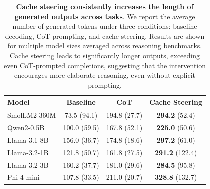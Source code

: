 \begin{table}[t!]
\caption{\textbf{Cache steering consistently increases the length of generated outputs across tasks}. We report the average number of generated tokens under three conditions: baseline decoding, CoT prompting, and cache steering. Results are shown for multiple model sizes averaged across reasoning
benchmarks. Cache steering leads to significantly longer outputs, exceeding even CoT-prompted completions, suggesting that the intervention encourages more elaborate reasoning, even without explicit prompting.}
\centering
\begin{tabular}{lccc}
\toprule
\textbf{Model} & \textbf{Baseline} & \textbf{CoT} & \textbf{Cache Steering} \\
\midrule
SmolLM2-360M & 73.5 \tiny{(94.1)} & 194.8 \tiny{(27.7)} & \textbf{294.2} \tiny{(52.4)} \\
Qwen2-0.5B & 100.0 \tiny{(59.5)} & 167.8 \tiny{(52.1)} & \textbf{225.0} \tiny{(50.6)} \\
Llama-3.1-8B & 156.0 \tiny{(36.7)} & 174.8 \tiny{(18.6)} & \textbf{297.2} \tiny{(61.0)} \\
Llama-3.2-1B & 121.8 \tiny{(50.7)} & 161.8 \tiny{(27.5)} & \textbf{291.2} \tiny{(122.4)} \\
Llama-3.2-3B & 160.2 \tiny{(37.7)} & 181.0 \tiny{(29.6)} & \textbf{284.5} \tiny{(95.8)} \\
Phi-4-mini & 107.8 \tiny{(33.5)} & 211.0 \tiny{(20.7)} & \textbf{328.8} \tiny{(132.7)} \\
\bottomrule
\end{tabular}
\label{tab:averaged_n_tokens}
\end{table}